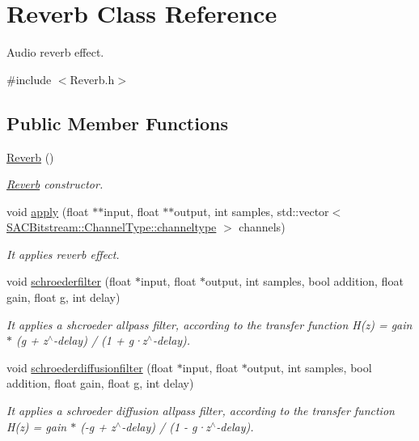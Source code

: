 \hypertarget{class_reverb}{}\section{Reverb Class Reference}
\label{class_reverb}


Audio reverb effect.  




{\ttfamily \#include $<$Reverb.\+h$>$}

\subsection*{Public Member Functions}
\begin{DoxyCompactItemize}
\item 
\mbox{\label{class_reverb_a765b925557df7e43bf5ed275fc6950d1}} 
\hyperlink{class_reverb_a765b925557df7e43bf5ed275fc6950d1}{Reverb} ()
\begin{DoxyCompactList}\small\item\em \hyperlink{class_reverb}{Reverb} constructor. \end{DoxyCompactList}\item 
void \hyperlink{class_reverb_aba9f2e90b04114cc9525b3b4cabfecf9}{apply} (float $\ast$$\ast$input, float $\ast$$\ast$output, int samples, std\+::vector$<$ \hyperlink{struct_s_a_c_bitstream_1_1_channel_type_a31c32b34085c06a1c58d920ca28c17c9}{S\+A\+C\+Bitstream\+::\+Channel\+Type\+::channeltype} $>$ channels)
\begin{DoxyCompactList}\small\item\em It applies reverb effect. \end{DoxyCompactList}\item 
void \hyperlink{class_reverb_acbac17709b0977fc0fabdb7bc2aa2f50}{schroederfilter} (float $\ast$input, float $\ast$output, int samples, bool addition, float gain, float g, int delay)
\begin{DoxyCompactList}\small\item\em It applies a shcroeder allpass filter, according to the transfer function H(z) = gain $\ast$ (g + z$^\wedge$-\/delay) / (1 + g·z$^\wedge$-\/delay). \end{DoxyCompactList}\item 
void \hyperlink{class_reverb_ab166279827798af21a9f19756d860be1}{schroederdiffusionfilter} (float $\ast$input, float $\ast$output, int samples, bool addition, float gain, float g, int delay)
\begin{DoxyCompactList}\small\item\em It applies a schroeder diffusion allpass filter, according to the transfer function H(z) = gain $\ast$ (-\/g + z$^\wedge$-\/delay) / (1 -\/ g·z$^\wedge$-\/delay). \end{DoxyCompactList}\item 

\end{DoxyCompactItemize}
